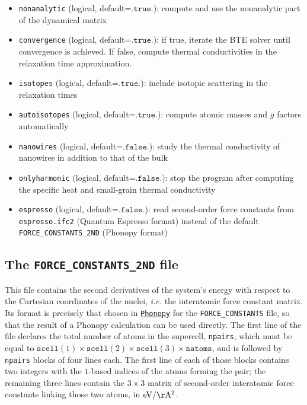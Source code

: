 \documentclass[a4paper,10pt,english]{article}
\begin{document}
\begin{description}
\begin{itemize}
    \item\texttt{nonanalytic} (logical, default=$.\mathtt{true}.$): compute and use the nonanalytic part of the dynamical matrix
    \item\texttt{convergence} (logical, default=$.\mathtt{true}.$): if true, iterate the BTE solver until convergence is achieved. If false, compute thermal conductivities in the relaxation time approximation.
    \item\texttt{isotopes} (logical, default=$.\mathtt{true}.$): include isotopic scattering in the relaxation times
    \item\texttt{autoisotopes} (logical, default=$.\mathtt{true}.$): compute atomic masses and $g$ factors automatically
    \item\texttt{nanowires} (logical, default=$.\mathtt{false}.$): study the thermal conductivity of nanowires in addition to that of the bulk
    \item\texttt{onlyharmonic} (logical, default=$.\mathtt{false}.$): stop the program after computing the specific heat and small-grain thermal conductivity
    \item\texttt{espresso} (logical, default=$.\mathtt{false}.$): read second-order force constants from \texttt{espresso.ifc2} (Quantum Espresso format) instead of the default \texttt{FORCE\_CONSTANTS\_2ND} (Phonopy format)
  \end{itemize}
\end{description}

\subsection{The \texttt{FORCE\_CONSTANTS\_2ND} file}

This file contains the second derivatives of the system's energy with respect to the Cartesian coordinates of the nuclei, \textit{i.e.} the interatomic force constant matrix. Its format is precisely that chosen in  \href{http://phonopy.sourceforge.net/}{\nolinkurl{Phonopy}} for the \texttt{FORCE\_CONSTANTS} file, so that the result of a Phonopy calculation can be used directly. The first line of the file declares the total number of atoms in the supercell, \texttt{npairs}, which must be equal to $\mathtt{scell}\left(1\right)\times\mathtt{scell}\left(2\right)\times\mathtt{scell}\left(3\right)\times\mathtt{natoms}$, and is followed by \texttt{npairs} blocks of four lines each. The first line of each of those blocks contains two integers with the $1$-based indices of the atoms forming the pair; the remaining three lines contain the $3\times 3$ matrix of second-order interatomic force constants linking those two atoms, in $\mathrm{eV/\AA^2}$.
\end{document}
